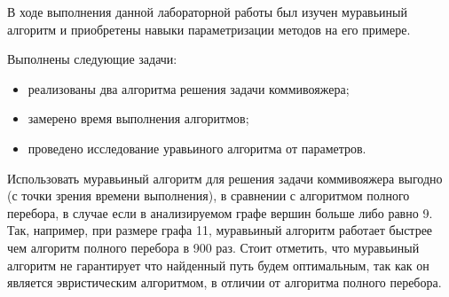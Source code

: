 \Conclusion
    В ходе выполнения данной лабораторной работы был изучен
    муравьиный алгоритм и приобретены навыки параметризации
    методов на его примере. 

    Выполнены следующие задачи:
    \begin{itemize}
        \item реализованы два алгоритма решения задачи коммивояжера;
        \item замерено время выполнения алгоритмов;
        \item проведено исследование уравьиного алгоритма от параметров.
    \end{itemize}
    
    Использовать муравьиный алгоритм для решения задачи коммивояжера выгодно (с точки зрения времени выполнения),
    в сравнении с алгоритмом полного перебора, в случае если в анализируемом графе вершин больше либо равно 9.
    Так, например, при размере графа 11, муравьиный алгоритм работает быстрее чем алгоритм полного перебора в 900 раз.
    Стоит отметить, что муравьиный алгоритм не гарантирует что найденный путь будем оптимальным,
    так как он является эвристическим алгоритмом, в отличии от алгоритма полного перебора.
    